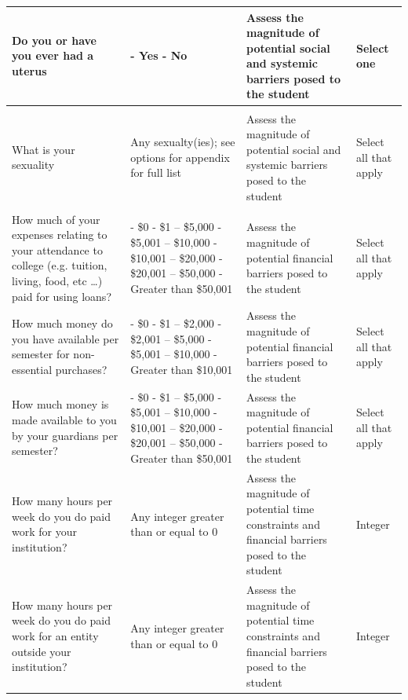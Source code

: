 \documentclass[10pt, twocolumn]{article}
\begin{document}
\begin{xltabular}{\textwidth}{|p{0.3\textwidth}|p{0.3\textwidth}|p{0.2\textwidth}|X|}
    Do you or have you ever had a uterus & - Yes \newline - No & Assess the magnitude of potential social and systemic barriers posed to the student & Select one \\ 
    \hline 
     \\ \hline
    What is your sexuality & Any sexualty(ies); see options for appendix for full list & Assess the magnitude of potential social and systemic barriers posed to the student & Select all that apply \\ 
    \hline 
     \\ \hline
    How much of your expenses relating to your attendance to college (e.g. tuition, living, food, etc \dots) paid for using loans? & - \$0 \newline - \$1 -- \$5,000 \newline - \$5,001 -- \$10,000 \newline - \$10,001 -- \$20,000 \newline - \$20,001 -- \$50,000 \newline - Greater than \$50,001 & Assess the magnitude of potential financial barriers posed to the student & Select all that apply \\ \hline 
    How much money do you have available per semester for non-essential purchases? & - \$0 \newline - \$1 -- \$2,000 \newline - \$2,001 -- \$5,000 \newline - \$5,001 -- \$10,000 \newline - Greater than \$10,001 & Assess the magnitude of potential financial barriers posed to the student & Select all that apply \\ \hline 
    How much money is made available to you by your guardians per semester? & - \$0 \newline - \$1 -- \$5,000 \newline - \$5,001 -- \$10,000 \newline - \$10,001 -- \$20,000 \newline - \$20,001 -- \$50,000 \newline - Greater than \$50,001 & Assess the magnitude of potential financial barriers posed to the student & Select all that apply \\ \hline 
    How many hours per week do you do paid work for your institution? & Any integer greater than or equal to 0 & Assess the magnitude of potential time constraints and financial barriers posed to the student & Integer \\ \hline 
    How many hours per week do you do paid work for an entity outside your institution? & Any integer greater than or equal to 0 & Assess the magnitude of potential time constraints and financial barriers posed to the student & Integer \\ \hline 
    
\end{xltabular}
\end{document}
